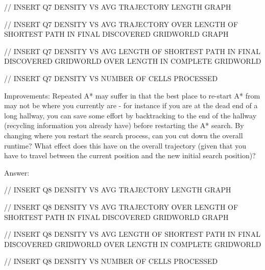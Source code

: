 \documentclass{homeworg}
\begin{document}
// INSERT Q7 DENSITY VS AVG TRAJECTORY LENGTH GRAPH

// INSERT Q7 DENSITY VS AVG TRAJECTORY OVER LENGTH OF SHORTEST PATH IN FINAL DISCOVERED GRIDWORLD GRAPH

// INSERT Q7 DENSITY VS AVG LENGTH OF SHORTEST PATH IN FINAL DISCOVERED GRIDWORLD OVER LENGTH IN COMPLETE GRIDWORLD

// INSERT Q7 DENSITY VS NUMBER OF CELLS PROCESSED

\newpage
\exercise*
Improvements: Repeated A* may suffer in that the best place to re-start A* from may
not be where you currently are - for instance if you are at the dead end of a long hallway, you can save some effort by backtracking to the end of the hallway (recycling information you already have) before restarting the A* search. By changing where you restart the search process, can you cut down the overall runtime? What effect does this have on the overall trajectory (given that you have to travel between the current position and the new initial search position)?

Answer:

// INSERT Q8 DENSITY VS AVG TRAJECTORY LENGTH GRAPH

// INSERT Q8 DENSITY VS AVG TRAJECTORY OVER LENGTH OF SHORTEST PATH IN FINAL DISCOVERED GRIDWORLD GRAPH

// INSERT Q8 DENSITY VS AVG LENGTH OF SHORTEST PATH IN FINAL DISCOVERED GRIDWORLD OVER LENGTH IN COMPLETE GRIDWORLD

// INSERT Q8 DENSITY VS NUMBER OF CELLS PROCESSED
\end{document}
